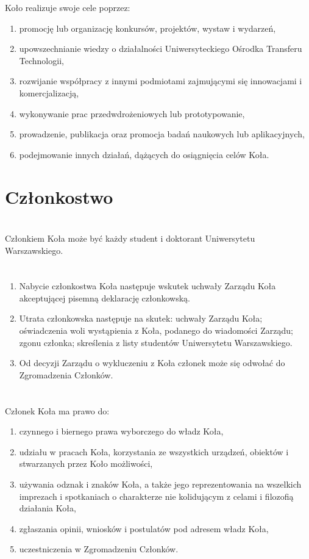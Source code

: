 \documentclass[a4paper]{article}
\begin{document}
Koło realizuje swoje cele poprzez:
\begin{enumerate}[label=\alph*)]
\item promocję lub organizację konkursów, projektów, wystaw i wydarzeń,
\item upowszechnianie wiedzy o działalności Uniwersyteckiego Ośrodka Transferu Technologii,
\item rozwijanie współpracy z innymi podmiotami zajmującymi się innowacjami i komercjalizacją,
\item wykonywanie prac przedwdrożeniowych lub prototypowanie,
\item prowadzenie, publikacja oraz promocja badań naukowych lub aplikacyjnych,
\item podejmowanie innych działań, dążących do osiągnięcia celów Koła.
\end{enumerate}


\section*{Członkostwo~~~}
\section{}
Członkiem Koła może być każdy student i doktorant Uniwersytetu Warszawskiego.

\section{}
\begin{enumerate}
\item Nabycie członkostwa Koła następuje wskutek uchwały Zarządu Koła akceptującej pisemną deklarację członkowską.
\item Utrata członkowska następuje na skutek: uchwały Zarządu Koła; oświadczenia woli wystąpienia z Koła, podanego do wiadomości Zarządu; zgonu członka; skreślenia z listy studentów Uniwersytetu Warszawskiego.
\item Od decyzji Zarządu o wykluczeniu z Koła członek może się odwołać do Zgromadzenia Członków.
\end{enumerate}

\section{}
Członek Koła ma prawo do:
\begin{enumerate}[label=\alph*)]
\item czynnego i biernego prawa wyborczego do władz Koła,
\item udziału w pracach Koła, korzystania ze wszystkich urządzeń, obiektów i stwarzanych przez Koło możliwości,
\item używania odznak i znaków Koła, a także jego reprezentowania na wszelkich imprezach i spotkaniach o charakterze nie kolidującym z celami i filozofią działania Koła,
\item zgłaszania opinii, wniosków i postulatów pod adresem władz Koła,
\item uczestniczenia w Zgromadzeniu Członków.
\end{enumerate}
\end{document}

